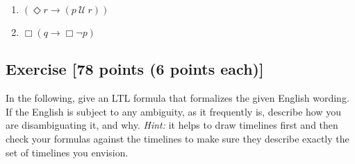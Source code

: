\documentclass{elsarticle} %
\begin{document}
\begin{enumerate}
\item $(\Diamond r \rightarrow (p \ \mathcal{U}\ r))$
\item $\Box (q \rightarrow \Box \neg p)$
\end{enumerate}

\subsection{Exercise [78 points (6 points each)]}
In the following, give an LTL formula that formalizes the given English wording. If the English is subject to any ambiguity, as it frequently is, describe how you are disambiguating it, and why. \emph{Hint:} it helps to draw timelines first and then check your formulas against the timelines to make sure they describe exactly the set of timelines you envision. %
\end{document}
